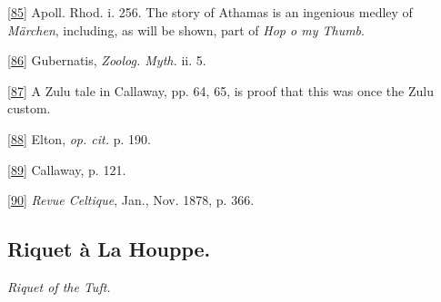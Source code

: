 \documentclass[14pt,a4paper]{memoir}
\begin{document}
\protect\hypertarget{4533318093929944247_33931-h-1.htm.xhtmlux5cux23Footnote_85}{}{}\protect\hyperlink{4533318093929944247_33931-h-1.htm.xhtmlux5cux23FNanchor_85}{{{[}85{]}}}
Apoll. Rhod. i. 256. The story of Athamas is an ingenious medley of
\emph{Märchen}, including, as will be shown, part of \emph{Hop
o\textquotesingle{} my Thumb}.

\protect\hypertarget{4533318093929944247_33931-h-1.htm.xhtmlux5cux23Footnote_86}{}{}\protect\hyperlink{4533318093929944247_33931-h-1.htm.xhtmlux5cux23FNanchor_86}{{{[}86{]}}}
Gubernatis, \emph{Zoolog. Myth.} ii. 5.

\protect\hypertarget{4533318093929944247_33931-h-1.htm.xhtmlux5cux23Footnote_87}{}{}\protect\hyperlink{4533318093929944247_33931-h-1.htm.xhtmlux5cux23FNanchor_87}{{{[}87{]}}}
A Zulu tale in Callaway, pp. 64, 65, is proof that this was once the
Zulu custom.

\protect\hypertarget{4533318093929944247_33931-h-1.htm.xhtmlux5cux23Footnote_88}{}{}\protect\hyperlink{4533318093929944247_33931-h-1.htm.xhtmlux5cux23FNanchor_88}{{{[}88{]}}}
Elton, \emph{op. cit.} p. 190.

\protect\hypertarget{4533318093929944247_33931-h-1.htm.xhtmlux5cux23Footnote_89}{}{}\protect\hyperlink{4533318093929944247_33931-h-1.htm.xhtmlux5cux23FNanchor_89}{{{[}89{]}}}
Callaway, p. 121.

\protect\hypertarget{4533318093929944247_33931-h-1.htm.xhtmlux5cux23Footnote_90}{}{}\protect\hyperlink{4533318093929944247_33931-h-1.htm.xhtmlux5cux23FNanchor_90}{{{[}90{]}}}
\emph{Revue Celtique}, Jan., Nov. 1878, p. 366.

\subsection{Riquet à La Houppe.}

\emph{Riquet of the Tuft.} \\
\end{document}
